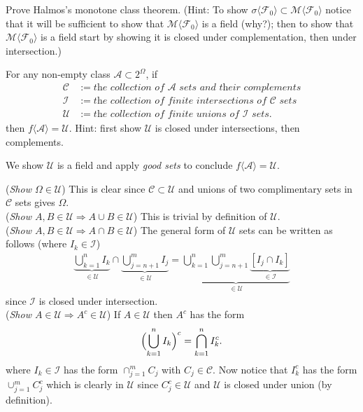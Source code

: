 \begin{exercise}
Prove Halmos's monotone class theorem. (Hint: To show $\sigma\langle \mathcal F_0 \rangle \subset \mathscr M\langle \mathcal F_0\rangle$ notice that it will be sufficient to show that $\mathscr M\langle \mathcal F_0\rangle$ is a field (why?); then to show  that $\mathscr M\langle \mathcal F_0\rangle$ is a field start by showing it is closed under complementation, then under intersection.)
\end{exercise}




\begin{exercise}
 \label{h2}
For any non-empty class $\mathcal A\subset 2^\Omega$, if
\begin{align*}
\mathcal C &:= \textit{the collection of $\mathcal A$ sets and their complements}\\
\mathcal I &:= \textit{the collection of finite intersections of $\mathcal C$ sets} \\
\mathcal U &:=\textit{the  collection of finite unions of $\mathcal I$ sets}.
\end{align*}
then $f\langle\mathcal A\rangle = \mathcal U$. Hint: first show $\mathcal U$ is closed under intersections, then complements.
\end{exercise}
\begin{exerciseproof}
We show $\mathcal U$  is a field and apply {\it good sets} to conclude $f\langle\mathcal A\rangle = \mathcal U$.


\flushleft\textbullet({\sl Show $\Omega \in \mathcal U$}) This is clear since $\mathcal C\subset \mathcal U$ and unions of two complimentary sets in  $\mathcal C$ sets gives $\Omega$.
\\
\textbullet({\sl Show $A,B\in \mathcal U\Longrightarrow A\cup B\in \mathcal U$}) This is trivial by definition of $\mathcal U$.
\\
\textbullet({\sl Show $A,B\in \mathcal U\Longrightarrow A\cap B\in \mathcal U$}) The general form of $\mathcal U$ sets can be written as follows (where $I_k\in\mathcal I$)
\begin{align*}
\underbrace{\bigcup_{k=1}^n I_k}_{\in \mathcal U}  \cap \underbrace{\bigcup_{j=n+1}^m I_{j}}_{\in \mathcal U} = \underbrace{\bigcup_{k=1}^n  \bigcup_{j=n+1}^m \underbrace{[I_{j}\cap I_{k}]}_{\in \mathcal I} }_{\in \mathcal U}
\end{align*}
since $\mathcal I$ is closed under intersection.
\\
\textbullet({\sl Show $A\in \mathcal U\Longrightarrow A^c\in \mathcal U$})
If $A\in \mathcal U$ then $A^c$ has the form
\[
\Bigl(\bigcup_{k=1}^n I_k \Bigr)^c = \bigcap_{k=1}^n I_k^c.
\]
where $I_k\in \mathcal I$ has the form $\cap_{j=1}^m C_j$ with $C_j\in \mathcal C$. Now notice that $I_k^c$ has the form $\cup_{j=1}^m C_j^c$ which is clearly in $\mathcal U$ since  $C_j^c\in\mathcal U$ and $\mathcal U$ is closed under union (by definition).
\end{exerciseproof}



